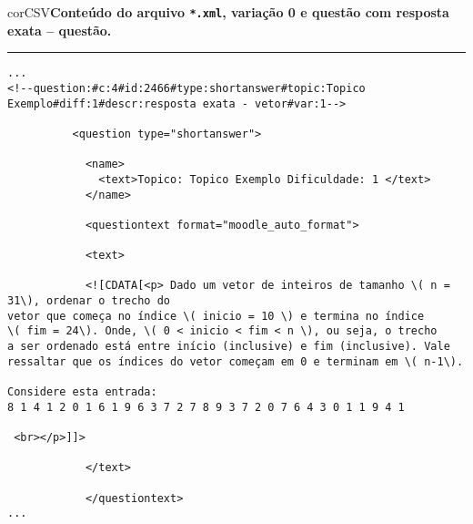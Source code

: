 \begin{myboxCode}{corCSV}{\textbf{Conteúdo do arquivo \texttt{*.xml}, variação 0 e questão com resposta exata -- questão.}}\vspace{3mm}
\hrule
{\scriptsize
\begin{verbatim}
...
<!--question:#c:4#id:2466#type:shortanswer#topic:Topico Exemplo#diff:1#descr:resposta exata - vetor#var:1-->

          <question type="shortanswer">
          
            <name>
              <text>Topico: Topico Exemplo Dificuldade: 1 </text>
            </name>
            
            <questiontext format="moodle_auto_format">
            
            <text>
            
            <![CDATA[<p> Dado um vetor de inteiros de tamanho \( n = 31\), ordenar o trecho do 
vetor que começa no índice \( inicio = 10 \) e termina no índice 
\( fim = 24\). Onde, \( 0 < inicio < fim < n \), ou seja, o trecho 
a ser ordenado está entre início (inclusive) e fim (inclusive). Vale 
ressaltar que os índices do vetor começam em 0 e terminam em \( n-1\). 
            
Considere esta entrada:
8 1 4 1 2 0 1 6 1 9 6 3 7 2 7 8 9 3 7 2 0 7 6 4 3 0 1 1 9 4 1
  
 <br></p>]]>
 
            </text>
 
            </questiontext>         
...
\end{verbatim}
}
\end{myboxCode}

